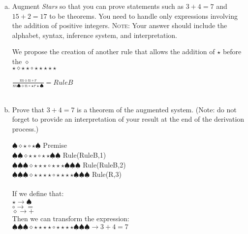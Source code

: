 \documentclass[11pt]{article}
\begin{document}
    \begin{enumerate}[(a)]
        \item Augment {\em Stars} so that you can prove statements such as $3+4=7$ and $15 + 2 = 17$ to be theorems.
        You need to handle only expressions involving the addition of positive integers.
        \textsc{Note:} Your answer should include the alphabet, syntax, inference system,
        and interpretation.

        We propose the creation of another rule that allows the addition of ${\star}$ before the ${\diamond}$
        \\
        ${\star}{\diamond}{\star}{\star}{\circ}{\star}{\star}{\star}{\star}{\star}$ \\
        \\
        $\frac{m{\diamond}n{\circ}r}{m{\spadesuit}{\diamond}n{\circ}{\star}r{\star}{\spadesuit}} = RuleB$\\
        \\
        \item Prove that $3 + 4 = 7$ is a theorem of the augmented system. (Note: do not forget to provide an interpretation of your result at the end of the derivation process.)


        ${\spadesuit}{\diamond}{\star}{\circ}{\star}{\spadesuit}$ Premise\\
        ${\spadesuit}{\spadesuit}{\diamond}{\star}{\star}{\circ}{\star}{\star}{\spadesuit}{\spadesuit}$ Rule(RuleB,1) \\
        ${\spadesuit}{\spadesuit}{\spadesuit}{\diamond}{\star}{\star}{\star}{\circ}{\star}{\star}{\star}{\spadesuit}{\spadesuit}{\spadesuit}$ Rule(RuleB,2) \\
        ${\spadesuit}{\spadesuit}{\spadesuit}{\diamond}{\star}{\star}{\star}{\star}{\circ}{\star}{\star}{\star}{\star}{\spadesuit}{\spadesuit}{\spadesuit}$ Rule(R,3) \\
        \\
        If we define that: \\
        $\star \rightarrow \spadesuit$ \\
        $\circ \rightarrow =$ \\
        $\diamond \rightarrow +$ \\
        Then we can transform the expression: \\
        ${\spadesuit}{\spadesuit}{\spadesuit}{\diamond}{\star}{\star}{\star}{\star}{\circ}{\star}{\star}{\star}{\star}{\spadesuit}{\spadesuit}{\spadesuit} \rightarrow 3 + 4 = 7 $\\

    \end{enumerate}
\end{document}

